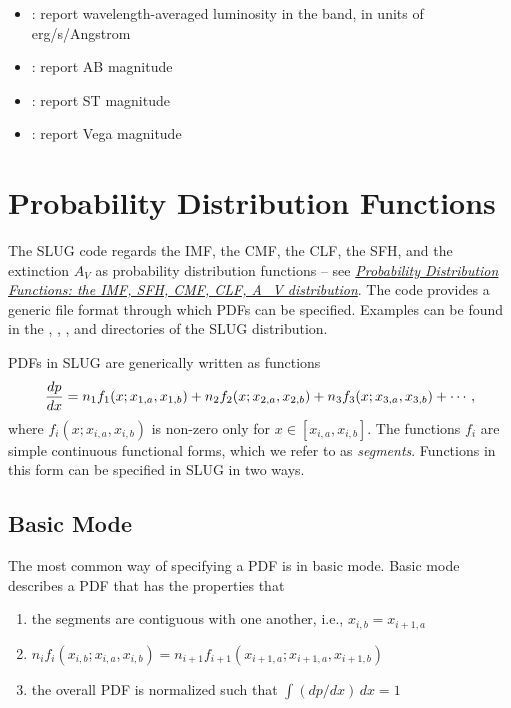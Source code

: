 \documentclass[letterpaper,10pt,english]{sphinxmanual}
\begin{document}
\begin{itemize}
\begin{description}
\begin{itemize}
\item {} 
: report wavelength-averaged luminosity in the band, in units of erg/s/Angstrom

\item {} 
: report AB magnitude

\item {} 
: report ST magnitude

\item {} 
: report Vega magnitude

\end{itemize}

\end{description}

\end{itemize}


\chapter{Probability Distribution Functions}
\label{pdfs:probability-distribution-functions}\label{pdfs::doc}\label{pdfs:sec-pdfs}
The SLUG code regards the IMF, the CMF, the CLF, the SFH, and the extinction \(A_V\) as probability distribution functions -- see {\hyperref[intro:ssec\string-slugpdfs]{\emph{Probability Distribution Functions: the IMF, SFH, CMF, CLF, A\_V distribution}}}. The code provides a generic file format through which PDFs can be specified. Examples can be found in the , , , and  directories of the SLUG distribution.

PDFs in SLUG are generically written as functions
\begin{gather}
\begin{split}\frac{dp}{dx} = n_1 f_1(x; x_{1,a}, x_{1,b}) + n_2 f_2(x; x_{2,a}, x_{2,b}) + n_3 f_3(x; x_{3,a}, x_{3,b}) + \cdots,\end{split}\notag
\end{gather}
where \(f_i(x; x_{i,a}, x_{i,b})\) is non-zero only for \(x \in [x_{i,a}, x_{i,b}]\). The functions \(f_i\) are simple continuous functional forms, which we refer to as \emph{segments}. Functions in this form can be specified in SLUG in two ways.


\section{Basic Mode}
\label{pdfs:basic-mode}
The most common way of specifying a PDF is in basic mode. Basic mode describes a PDF that has the properties that
\begin{enumerate}
\item {} 
the segments are contiguous with one another, i.e., \(x_{i,b} = x_{i+1,a}\)

\item {} 
\(n_i f_i(x_{i,b}; x_{i,a}, x_{i,b}) = n_{i+1} f_{i+1}(x_{i+1,a}; x_{i+1,a}, x_{i+1,b})\)

\item {} 
the overall PDF is normalized such that \(\int (dp/dx)\, dx = 1\)

\end{enumerate}
\end{document}
